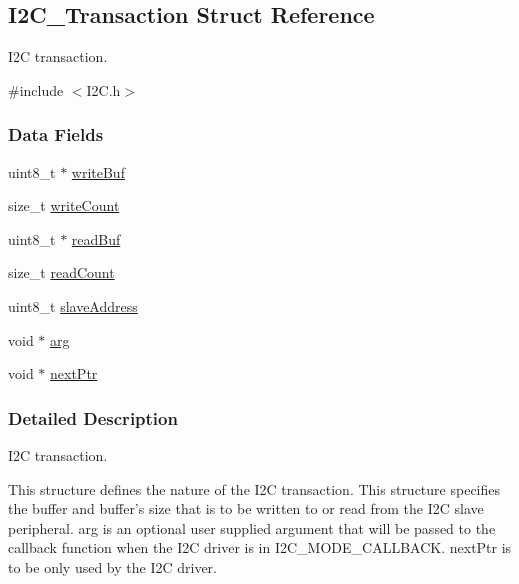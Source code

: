 \subsection{I2\-C\-\_\-\-Transaction Struct Reference}
\label{struct_i2_c___transaction}


I2\-C transaction.  




{\ttfamily \#include $<$I2\-C.\-h$>$}

\subsubsection*{Data Fields}
\begin{DoxyCompactItemize}
\item 
uint8\-\_\-t $\ast$ \hyperlink{struct_i2_c___transaction_a15f82555a6dce6261cd89ed02aa72c25}{write\-Buf}
\item 
size\-\_\-t \hyperlink{struct_i2_c___transaction_a08959a9f098163d02d6002e73b3a4606}{write\-Count}
\item 
uint8\-\_\-t $\ast$ \hyperlink{struct_i2_c___transaction_ad7b4bde147082e01263ab79bf391be66}{read\-Buf}
\item 
size\-\_\-t \hyperlink{struct_i2_c___transaction_a2085d4c943f0d8617365b7c427e6a0de}{read\-Count}
\item 
uint8\-\_\-t \hyperlink{struct_i2_c___transaction_aaf0269d5c542d5636bdfd4e72eb4d08f}{slave\-Address}
\item 
void $\ast$ \hyperlink{struct_i2_c___transaction_a29ec65addac2d4ef5d1235c2329e2fc1}{arg}
\item 
void $\ast$ \hyperlink{struct_i2_c___transaction_a21755edd4d999d6041d303e269596371}{next\-Ptr}
\end{DoxyCompactItemize}


\subsubsection{Detailed Description}
I2\-C transaction. 

This structure defines the nature of the I2\-C transaction. This structure specifies the buffer and buffer's size that is to be written to or read from the I2\-C slave peripheral. arg is an optional user supplied argument that will be passed to the callback function when the I2\-C driver is in I2\-C\-\_\-\-M\-O\-D\-E\-\_\-\-C\-A\-L\-L\-B\-A\-C\-K. next\-Ptr is to be only used by the I2\-C driver. 

